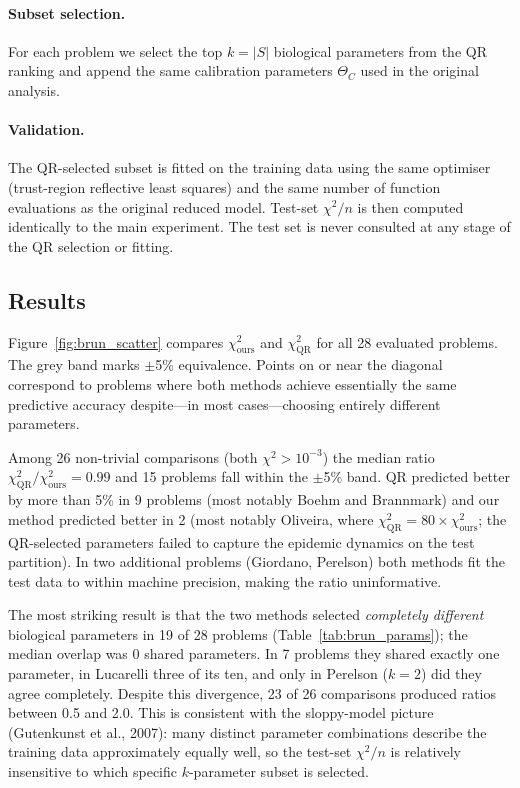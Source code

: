 \paragraph{Subset selection.}
For each problem we select the top $k = |S|$ biological parameters from the QR ranking and append the same calibration parameters $\Theta_C$ used in the original analysis.

\paragraph{Validation.}
The QR-selected subset is fitted on the training data using the same optimiser (trust-region reflective least squares) and the same number of function evaluations as the original reduced model.  Test-set $\chi^2/n$ is then computed identically to the main experiment.  The test set is never consulted at any stage of the QR selection or fitting.

\subsection*{Results}

Figure~\ref{fig:brun_scatter} compares $\chi^2_{\mathrm{ours}}$ and $\chi^2_{\mathrm{QR}}$ for all 28 evaluated problems.  The grey band marks $\pm$5\% equivalence.  Points on or near the diagonal correspond to problems where both methods achieve essentially the same predictive accuracy despite---in most cases---choosing entirely different parameters.

Among 26 non-trivial comparisons (both $\chi^2 > 10^{-3}$) the median ratio $\chi^2_{\mathrm{QR}}/\chi^2_{\mathrm{ours}} = 0.99$ and 15 problems fall within the $\pm$5\% band.  QR predicted better by more than 5\% in 9 problems (most notably Boehm and Brannmark) and our method predicted better in 2 (most notably Oliveira, where $\chi^2_{\mathrm{QR}} = 80\times\chi^2_{\mathrm{ours}}$; the QR-selected parameters failed to capture the epidemic dynamics on the test partition).  In two additional problems (Giordano, Perelson) both methods fit the test data to within machine precision, making the ratio uninformative.

The most striking result is that the two methods selected \emph{completely different} biological parameters in 19 of 28 problems (Table~\ref{tab:brun_params}); the median overlap was 0 shared parameters.  In 7 problems they shared exactly one parameter, in Lucarelli three of its ten, and only in Perelson ($k=2$) did they agree completely.  Despite this divergence, 23 of 26 comparisons produced ratios between 0.5 and 2.0.  This is consistent with the sloppy-model picture (Gutenkunst et al., 2007): many distinct parameter combinations describe the training data approximately equally well, so the test-set $\chi^2/n$ is relatively insensitive to which specific $k$-parameter subset is selected.

